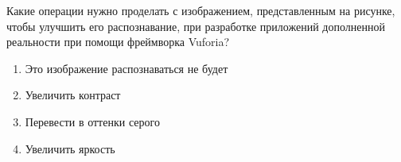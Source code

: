 
Какие операции нужно проделать с изображением, представленным на рисунке, чтобы улучшить его распознавание, при разработке приложений дополненной реальности при помощи фреймворка Vuforia? 


\begin{enumerate}
    \item Это изображение распознаваться не будет
    \item Увеличить контраст
    \item Перевести в оттенки серого
    \item Увеличить яркость
\end{enumerate}


